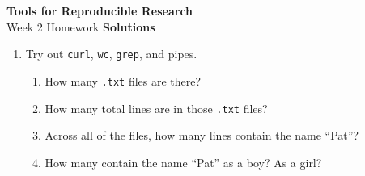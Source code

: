\documentclass[12pt]{article}
\newcommand{\ttsm}{\tt \small}
\begin{document}
\thispagestyle{empty}

\textbf{Tools for Reproducible Research} \\
Week 2 Homework \textbf{Solutions}

\bigskip

\begin{enumerate}

\addtocounter{enumi}{1}

\item Try out {\ttsm curl}, {\ttsm wc}, {\ttsm grep}, and pipes.

  \begin{enumerate}
    \addtocounter{enumii}{4}

  \item How many {\ttsm .txt} files are there?

  \item How many total lines are in those {\ttsm .txt} files?

  \item Across all of the files, how many lines contain the name
    ``Pat''?

  \item How many contain the name ``Pat'' as a boy? As a girl?
  \end{enumerate}

\end{enumerate}
\end{document}
